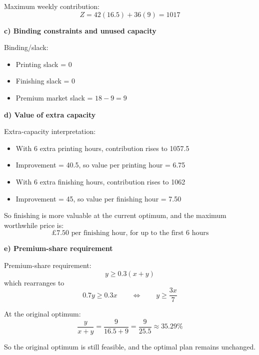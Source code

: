 \documentclass[11pt,a4paper]{article}
\begin{document}
Maximum weekly contribution:
\[
Z = 42(16.5) + 36(9) = 1017
\]

\textbf{c) Binding constraints and unused capacity}

Binding/slack:
\begin{itemize}
\item Printing slack = 0
\item Finishing slack = 0
\item Premium market slack = $18 - 9 = 9$
\end{itemize}

\textbf{d) Value of extra capacity}

Extra-capacity interpretation:
\begin{itemize}
\item With 6 extra printing hours, contribution rises to 1057.5
\item Improvement = 40.5, so value per printing hour = 6.75
\item With 6 extra finishing hours, contribution rises to 1062
\item Improvement = 45, so value per finishing hour = 7.50
\end{itemize}

So finishing is more valuable at the current optimum, and the maximum worthwhile price is:
\[
\pounds 7.50 \text{ per finishing hour, for up to the first 6 hours}
\]

\textbf{e) Premium-share requirement}

Premium-share requirement:
\[
y \ge 0.3(x + y)
\]
which rearranges to
\[
0.7y \ge 0.3x \qquad \Longleftrightarrow \qquad y \ge \frac{3x}{7}
\]

At the original optimum:
\[
\frac{y}{x+y} = \frac{9}{16.5 + 9} = \frac{9}{25.5} \approx 35.29\%
\]

So the original optimum is still feasible, and the optimal plan remains unchanged.
\end{document}
